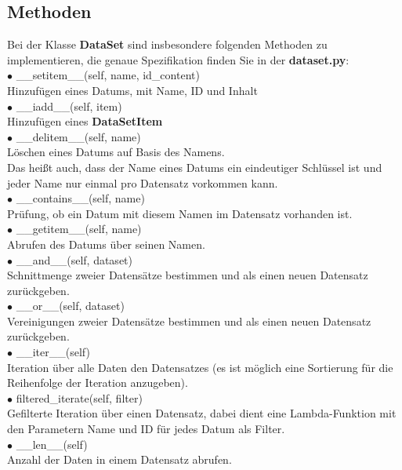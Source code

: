 \documentclass[
 12pt, %
 a4paper, %
 parskip=full %
]{scrartcl}
\begin{document}
\subsection{Methoden}
Bei der Klasse \textbf{DataSet} sind insbesondere folgenden Methoden zu implementieren, die genaue Spezifikation finden Sie in der \textbf{dataset.py}:\\
$\bullet$ \_\_setitem\_\_(self, name, id\_content)\\
\hspace*{1cm} Hinzufügen eines Datums, mit Name, ID und Inhalt\\
$\bullet$ \_\_iadd\_\_(self, item)\\
\hspace*{1cm} Hinzufügen eines \textbf{DataSetItem}\\
$\bullet$ \_\_delitem\_\_(self, name)\\
\hspace*{1cm} Löschen eines Datums auf Basis des Namens.\\
\hspace*{1cm} Das heißt auch, dass der Name eines Datums ein eindeutiger Schlüssel ist und jeder Name nur einmal pro Datensatz vorkommen kann.\\
$\bullet$ \_\_contains\_\_(self, name)\\
\hspace*{1cm} Prüfung, ob ein Datum mit diesem Namen im Datensatz vorhanden ist.\\
$\bullet$ \_\_getitem\_\_(self, name)\\
\hspace*{1cm} Abrufen des Datums über seinen Namen.\\ 
$\bullet$ \_\_and\_\_(self, dataset)\\
\hspace*{1cm} Schnittmenge zweier Datensätze bestimmen und als einen neuen Datensatz zurückgeben.\\
$\bullet$ \_\_or\_\_(self, dataset)\\
\hspace*{1cm} Vereinigungen zweier Datensätze bestimmen und als einen neuen Datensatz zurückgeben.\\
$\bullet$ \_\_iter\_\_(self)\\
\hspace*{1cm} Iteration über alle Daten den Datensatzes (es ist möglich eine Sortierung für die Reihenfolge der Iteration anzugeben).\\ 
$\bullet$ filtered\_iterate(self, filter)\\
\hspace*{1cm} Gefilterte Iteration über einen Datensatz, dabei dient eine Lambda-Funktion mit den Parametern Name und ID für jedes Datum als Filter.\\
$\bullet$ \_\_len\_\_(self)\\
\hspace*{1cm} Anzahl der Daten in einem Datensatz abrufen.\\
\\
\end{document}
